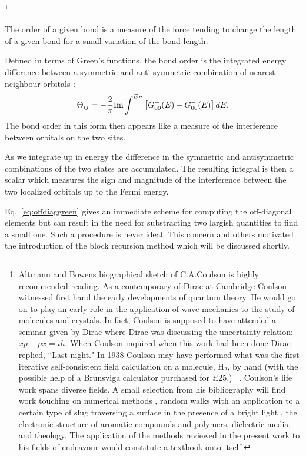 \footnote{Altmann and Bowens biographical sketch of C.A.Coulson\cite{altmann74} 
is highly recommended reading. As a contemporary of Dirac at Cambridge
Coulson witnessed first hand the early developments of quantum theory. 
He would go on to play an early role in the application of wave mechanics 
to the study of molecules and crystals. 
In fact, Coulson is supposed to have attended a seminar given by Dirac 
where Dirac was discussing the uncertainty relation: $xp-px=ih$.
When Coulson inquired when this work had been done Dirac replied, 
``Last night." In 1938 Coulson may have performed what was
the first iterative self-consistent field calculation
on a molecule, H$_2$, by hand (with the possible help of a 
Brunsviga calculator purchased for \pounds 25.)
~\cite{coulson38}. Coulson's life work spans diverse fields.
A small selection from his bibliography will find work 
touching on numerical methods \cite{coulson37,coulson42}, 
random walks with an application to a certain type of slug 
traversing a surface in the presence of a bright light \cite{coulson47}, 
the electronic structure of aromatic compounds and polymers, 
dielectric media, and theology. The application of the methods 
reviewed in the present work to his fields of endeavour would 
constitute a textbook onto itself.}

The order of a given bond is a measure
of the force tending to change the length of a given bond
for a small variation of the bond length.

Defined in terms of Green's functions, the bond order is the integrated 
energy difference between a symmetric and anti-symmetric combination 
of nearest neighbour orbitals \cite{pettifor89}:
%
\begin{equation}
\label{eq:bondorder}
\Theta_{ij} = - \frac{2}{\pi} {\rm Im} \int^{E_{F}}\left[G^{+}_{00}(E)-G_{00}^{-}(E)\right]dE.
\end{equation}
%
The bond order in this form then appears like a measure of the interference 
between orbitals on the two sites.

As we integrate up in energy the difference in the symmetric and antisymmetric 
combinations of the two states are accumulated. The resulting integral is 
then a scalar which measures the sign and magnitude of the
interference between the two localized orbitals up to the Fermi energy.

Eq.~\ref{eq:offdiaggreen} gives an immediate scheme for computing the 
off-diagonal elements but can result in the need for substracting 
two largish quantities to find a small one. Such a procedure 
is never ideal. This concern and others motivated the introduction
of the block recursion method which will be discussed shortly.


